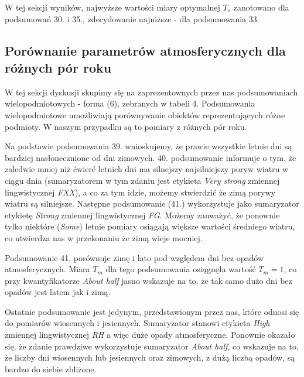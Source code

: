 \documentclass{classrep}
\begin{document}
W tej sekcji wyników, najwyższe wartości miary optymalnej $T_s$ zanotowano dla podsumowań 30. i 35., zdecydowanie najniższe - dla podsumowania 33.


\subsection{Porównanie parametrów atmosferycznych dla różnych pór roku}
W tej sekcji dyskusji skupimy się na zaprezentownych przez nas podsumowaniach wielopodmiotowych - forma (6), zebranych w tabeli 4. Podsumowania wielopodmiotowe umożliwiają porównywanie obiektów reprezentujących różne podmioty. W naszym przypadku są to pomiary z różnych pór roku.\newline

Na podstawie podsumowania 39. wnioskujemy, że prawie wszystkie letnie dni są bardziej nasłonecznione od dni zimowych. 40. podsumowanie informuje o tym, że zaledwie mniej niż ćwierć letnich dni ma silnejszy najsilniejszy poryw wiatru w ciągu dnia (sumaryzatorem w tym zdaniu jest etykieta \textit{Very strong} zmiennej lingwistycznej \textit{FXX}), a co za tym idzie, możemy stwierdzić że zimą porywy wiatru są silniejsze. Następne podsumowanie (41.) wykorzystuje jako sumaryzator etykietę \textit{Strong} zmiennej lingwistycznej \textit{FG}. Możemy zauważyć, że ponownie tylko niektóre (\textit{Some}) letnie pomiary osiągają większe wartości średniego wiatru, co utwierdza nas w przekonaniu że zimą wieje mocniej.\newline

Podsumowanie 41. porównuje zimę i lato pod względem dni bez opadów atmosferycznych. Miara $T_m$ dla tego podsumowania osiągnęła wartość $T_m = 1$, co przy kwantyfikatorze \textit{About half} jasno wskazuje na to, że tak samo dużo dni bez opadów jest latem jak i zimą.\newline

Ostatnie podsumowanie jest jedynym, przedstawionym przez nas, które odnosi się do pomiarów wiosennych i jesiennych. Sumaryzator stanowi etykieta \textit{High} zmiennej lingwistycznej \textit{RH} a więc duże opady atmosferyczne. Ponownie okazało się, że zdanie prawdziwe wykorzystuje sumaryzator \textit{About half}, co wskazuje na to, że liczby dni wiosennych lub jesiennych oraz zimowych, z dużą liczbą opadów, są bardzo do siebie zbliżone. 
\end{document}
